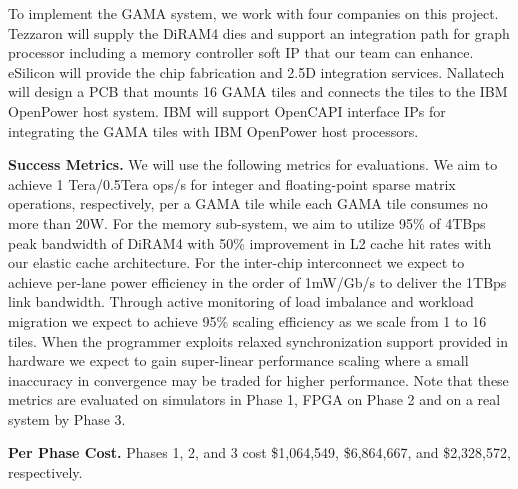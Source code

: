 

To implement the GAMA system, %
we work with four companies on this project. 
Tezzaron will supply the DiRAM4 dies and support an integration path for graph processor including a memory controller soft IP that our team can enhance.
eSilicon will provide the chip fabrication and 2.5D integration services.
Nallatech will design a PCB that mounts 16 GAMA tiles and connects the tiles to the IBM OpenPower host system. %
IBM will support OpenCAPI interface IPs for integrating the GAMA tiles with IBM OpenPower host processors. 

\vspace{3pt}
\noindent
\textbf{Success Metrics.} 
We will use the following metrics for evaluations.
We aim to achieve 1 Tera/0.5Tera ops/s for integer and floating-point sparse matrix operations, respectively, per a GAMA tile while each GAMA tile consumes no more than 20W.
For the memory sub-system, we aim to utilize 95\% of 4TBps peak bandwidth of DiRAM4 with 50\% improvement in L2 cache hit rates with our elastic cache architecture.
For the inter-chip interconnect we expect to achieve per-lane power efficiency in the order of 1mW/Gb/s to deliver the 1TBps link bandwidth. %
Through active monitoring of load imbalance and workload migration we expect to achieve 95\% scaling efficiency as we scale from 1 to 16 tiles. 
When the programmer exploits relaxed synchronization support provided in hardware  we expect to gain super-linear performance scaling where a small inaccuracy in convergence may be traded for higher performance.  
Note that these metrics are evaluated on simulators in Phase 1, FPGA on Phase 2 and on a real system by Phase 3.  


\vspace{3pt}
\noindent
\textbf{Per Phase Cost.} 
Phases 1, 2, and 3 cost \$1,064,549, \$6,864,667, and \$2,328,572, respectively.

